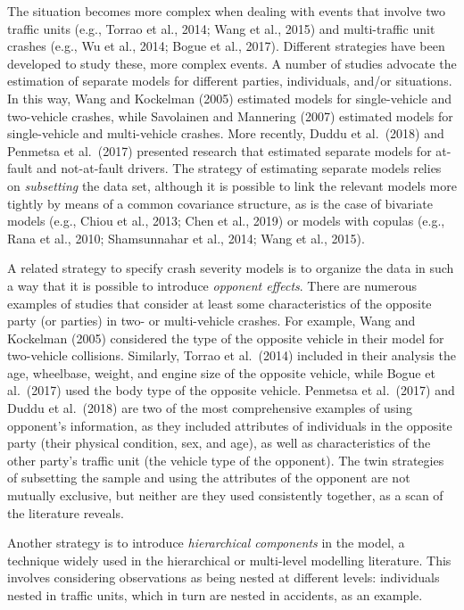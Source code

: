 \documentclass[]{elsarticle} %
\begin{document}
The situation becomes more complex when dealing with events that involve
two traffic units (e.g., Torrao et al., 2014; Wang et al., 2015) and
multi-traffic unit crashes (e.g., Wu et al., 2014; Bogue et al., 2017).
Different strategies have been developed to study these, more complex
events. A number of studies advocate the estimation of separate models
for different parties, individuals, and/or situations. In this way, Wang
and Kockelman (2005) estimated models for single-vehicle and two-vehicle
crashes, while Savolainen and Mannering (2007) estimated models for
single-vehicle and multi-vehicle crashes. More recently, Duddu et
al.~(2018) and Penmetsa et al.~(2017) presented research that estimated
separate models for at-fault and not-at-fault drivers. The strategy of
estimating separate models relies on \emph{subsetting} the data set,
although it is possible to link the relevant models more tightly by
means of a common covariance structure, as is the case of bivariate
models (e.g., Chiou et al., 2013; Chen et al., 2019) or models with
copulas (e.g., Rana et al., 2010; Shamsunnahar et al., 2014; Wang et
al., 2015).

A related strategy to specify crash severity models is to organize the
data in such a way that it is possible to introduce \emph{opponent
effects}. There are numerous examples of studies that consider at least
some characteristics of the opposite party (or parties) in two- or
multi-vehicle crashes. For example, Wang and Kockelman (2005) considered
the type of the opposite vehicle in their model for two-vehicle
collisions. Similarly, Torrao et al.~(2014) included in their analysis
the age, wheelbase, weight, and engine size of the opposite vehicle,
while Bogue et al.~(2017) used the body type of the opposite vehicle.
Penmetsa et al.~(2017) and Duddu et al.~(2018) are two of the most
comprehensive examples of using opponent's information, as they included
attributes of individuals in the opposite party (their physical
condition, sex, and age), as well as characteristics of the other
party's traffic unit (the vehicle type of the opponent). The twin
strategies of subsetting the sample and using the attributes of the
opponent are not mutually exclusive, but neither are they used
consistently together, as a scan of the literature reveals.

Another strategy is to introduce \emph{hierarchical components} in the
model, a technique widely used in the hierarchical or multi-level
modelling literature. This involves considering observations as being
nested at different levels: individuals nested in traffic units, which
in turn are nested in accidents, as an example.
\end{document}
